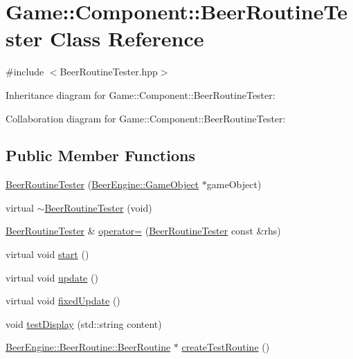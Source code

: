 \hypertarget{class_game_1_1_component_1_1_beer_routine_tester}{}\section{Game\+:\+:Component\+:\+:Beer\+Routine\+Tester Class Reference}
\label{class_game_1_1_component_1_1_beer_routine_tester}


{\ttfamily \#include $<$Beer\+Routine\+Tester.\+hpp$>$}



Inheritance diagram for Game\+:\+:Component\+:\+:Beer\+Routine\+Tester\+:


Collaboration diagram for Game\+:\+:Component\+:\+:Beer\+Routine\+Tester\+:
\subsection*{Public Member Functions}
\begin{DoxyCompactItemize}
\item 
\mbox{\hyperlink{class_game_1_1_component_1_1_beer_routine_tester_abcb7ea4145e8ef864f969c8503b0dabf}{Beer\+Routine\+Tester}} (\mbox{\hyperlink{class_beer_engine_1_1_game_object}{Beer\+Engine\+::\+Game\+Object}} $\ast$game\+Object)
\item 
virtual \mbox{\hyperlink{class_game_1_1_component_1_1_beer_routine_tester_a8be9160f8eb51946c517df27b6066fc4}{$\sim$\+Beer\+Routine\+Tester}} (void)
\item 
\mbox{\hyperlink{class_game_1_1_component_1_1_beer_routine_tester}{Beer\+Routine\+Tester}} \& \mbox{\hyperlink{class_game_1_1_component_1_1_beer_routine_tester_a9f75598140bb2e11d0d89d5b8a80f30e}{operator=}} (\mbox{\hyperlink{class_game_1_1_component_1_1_beer_routine_tester}{Beer\+Routine\+Tester}} const \&rhs)
\item 
virtual void \mbox{\hyperlink{class_game_1_1_component_1_1_beer_routine_tester_a7c721d466c33fd0a34e65707f55272a2}{start}} ()
\item 
virtual void \mbox{\hyperlink{class_game_1_1_component_1_1_beer_routine_tester_a2f14ce6211722f92a8ec5886dbeabd6c}{update}} ()
\item 
virtual void \mbox{\hyperlink{class_game_1_1_component_1_1_beer_routine_tester_a01abf9a71d6c3598a3c9a8c0d26c1615}{fixed\+Update}} ()
\item 
void \mbox{\hyperlink{class_game_1_1_component_1_1_beer_routine_tester_a08fca7a8e15f6e207f14e9ae2b984d62}{test\+Display}} (std\+::string content)
\item 
\mbox{\hyperlink{class_beer_engine_1_1_beer_routine_1_1_beer_routine}{Beer\+Engine\+::\+Beer\+Routine\+::\+Beer\+Routine}} $\ast$ \mbox{\hyperlink{class_game_1_1_component_1_1_beer_routine_tester_ad3edfa2389d65a4e11514695e9187a74}{create\+Test\+Routine}} ()
\end{DoxyCompactItemize}
